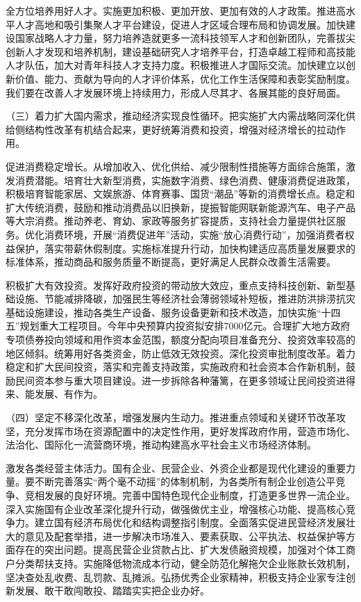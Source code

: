 \documentclass[10pt, UTF8]{ctexbook} %
\begin{document}
全方位培养用好人才。实施更加积极、更加开放、更加有效的人才政策。推进高水平人才高地和吸引集聚人才平台建设，促进人才区域合理布局和协调发展。加快建设国家战略人才力量，努力培养造就更多一流科技领军人才和创新团队，完善拔尖创新人才发现和培养机制，建设基础研究人才培养平台，打造卓越工程师和高技能人才队伍，加大对青年科技人才支持力度。积极推进人才国际交流。加快建立以创新价值、能力、贡献为导向的人才评价体系，优化工作生活保障和表彰奖励制度。我们要在改善人才发展环境上持续用力，形成人尽其才、各展其能的良好局面。

（三）着力扩大国内需求，推动经济实现良性循环。把实施扩大内需战略同深化供给侧结构性改革有机结合起来，更好统筹消费和投资，增强对经济增长的拉动作用。

促进消费稳定增长。从增加收入、优化供给、减少限制性措施等方面综合施策，激发消费潜能。培育壮大新型消费，实施数字消费、绿色消费、健康消费促进政策，积极培育智能家居、文娱旅游、体育赛事、国货“潮品”等新的消费增长点。稳定和扩大传统消费，鼓励和推动消费品以旧换新，提振智能网联新能源汽车、电子产品等大宗消费。推动养老、育幼、家政等服务扩容提质，支持社会力量提供社区服务。优化消费环境，开展“消费促进年”活动，实施“放心消费行动”，加强消费者权益保护，落实带薪休假制度。实施标准提升行动，加快构建适应高质量发展要求的标准体系，推动商品和服务质量不断提高，更好满足人民群众改善生活需要。

积极扩大有效投资。发挥好政府投资的带动放大效应，重点支持科技创新、新型基础设施、节能减排降碳，加强民生等经济社会薄弱领域补短板，推进防洪排涝抗灾基础设施建设，推动各类生产设备、服务设备更新和技术改造，加快实施“十四五”规划重大工程项目。今年中央预算内投资拟安排7000亿元。合理扩大地方政府专项债券投向领域和用作资本金范围，额度分配向项目准备充分、投资效率较高的地区倾斜。统筹用好各类资金，防止低效无效投资。深化投资审批制度改革。着力稳定和扩大民间投资，落实和完善支持政策，实施政府和社会资本合作新机制，鼓励民间资本参与重大项目建设。进一步拆除各种藩篱，在更多领域让民间投资进得来、能发展、有作为。

（四）坚定不移深化改革，增强发展内生动力。推进重点领域和关键环节改革攻坚，充分发挥市场在资源配置中的决定性作用，更好发挥政府作用，营造市场化、法治化、国际化一流营商环境，推动构建高水平社会主义市场经济体制。

激发各类经营主体活力。国有企业、民营企业、外资企业都是现代化建设的重要力量。要不断完善落实“两个毫不动摇”的体制机制，为各类所有制企业创造公平竞争、竞相发展的良好环境。完善中国特色现代企业制度，打造更多世界一流企业。深入实施国有企业改革深化提升行动，做强做优主业，增强核心功能、提高核心竞争力。建立国有经济布局优化和结构调整指引制度。全面落实促进民营经济发展壮大的意见及配套举措，进一步解决市场准入、要素获取、公平执法、权益保护等方面存在的突出问题。提高民营企业贷款占比、扩大发债融资规模，加强对个体工商户分类帮扶支持。实施降低物流成本行动，健全防范化解拖欠企业账款长效机制，坚决查处乱收费、乱罚款、乱摊派。弘扬优秀企业家精神，积极支持企业家专注创新发展、敢干敢闯敢投、踏踏实实把企业办好。
\end{document}
